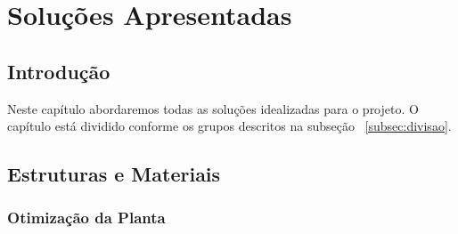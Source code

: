 \part{Soluções Apresentadas}
\chapter[Introdução]{Introdução}
Neste capítulo abordaremos todas as soluções idealizadas para o projeto. O capítulo está dividido conforme os grupos descritos na subseção ~\ref{subsec:divisao}.

\chapter[Estruturas e Materiais]{Estruturas e Materiais}

\section{Otimização da Planta}

